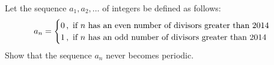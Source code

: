Let the sequence $a_1, a_2, \ldots $ of integers be defined as follows:
$$a_n = 
\begin{cases}
	0 \text{\,,\, if $n$ has an even number of divisors greater than 2014}\\
	1 \text{\,,\, if $n$ has an odd number of divisors greater than 2014}
\end{cases}$$
Show that the sequence $a_n$ never becomes periodic.